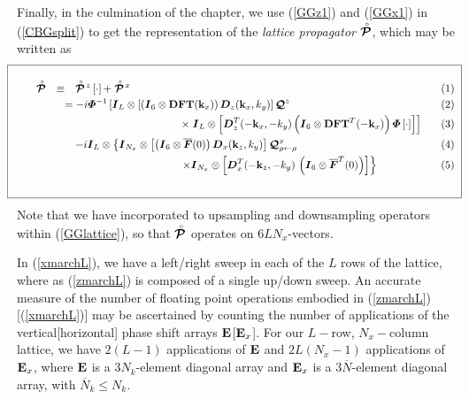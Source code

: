 Finally, in the culmination of the chapter, we use (\ref{GGz1}) and (\ref{GGx1}) in 
(\ref{CBGsplit}) to get the representation of 
the {\em lattice propagator\/} $\stackrel{\scriptscriptstyle _{\,\,\circ}}{ \mbox{\boldmath$\cal P$\unboldmath}}$, which may be written as
\[
\!\!\!\!\!\!\fbox{
\begin{minipage} {146.0mm}
\begin{samepage}
\begin{eqnarray}\label{GGlattice}
\!\!\!\!\!\!\!\!\!
\rf{\CB P} &\equiv&
\rf{\CB P}\!{}^{z}\left[ \cdot \right]+ \rf{\CB  P}\!{}^{x}\nonumber\\
&&\!\!\!\!\!\!= -i{\bmi \Phi}{}^{-1}\left[  {\bmi I}_L \otimes\left[\left({\bmi I}_{6}\otimes 
{\bf DFT}({\bf k}_{x}) \right){\bmi  D}_{z}({\bf k}_{x},{k}_{y})\right]
 {\CB Q}^{z}\right.\nonumber\\
&&\qquad\qquad\qquad\qquad\qquad
\times \left.
 {\bmi I}_L \otimes \left[
{\bmi  D}^{T}_{z}(-{\bf k}_{x},-{k}_{y})\left({\bmi I}_{6}\otimes
{\bf DFT}^{T}(-{\bf k}_{x})  \right)  {\bmi \Phi}\left[ \cdot \right] \right]\right]\nonumber\\
&&
 -{i}{\bmi I}_L \otimes\left\{ {\bmi I}_{N_x} \otimes
\left[\left({\bmi I}_{6}\otimes \overline{\bmi F}(0)  \right)
 {\bmi  D}_{x}({\bf k}_{z},{k}_{y})\right]
 {\CB Q}{}^{x}_{\rho \leftarrow \rho}
\right.\nonumber\\
&&\qquad\qquad\qquad\qquad\qquad
\left.
\times{\bmi I}_{N_x} \otimes \left[{\bmi  D}_{x}^{T}(-{\bf k}_{z},-{k}_{y})
\,\left({\bmi I}_{6}\otimes \overline{\bmi F}^{T}(0)  \right)
\right] \right\}
\end{eqnarray}
\end{samepage}
\vspace{1 mm}
\end{minipage}
}
\]
Note that we have incorporated to upsampling and downsampling operators 
within (\ref{GGlattice}), so that $\stackrel{\scriptscriptstyle _{\,\,\circ}}{ \mbox{\boldmath$\cal P$\unboldmath}}$ operates on $6 L 
N_x$-vectors.


In (\ref{xmarchL}), we have a left/right sweep in each of the $L$ rows of 
the lattice, where as (\ref{zmarchL}) is composed of a single up/down 
sweep. An accurate measure of the number of floating point operations 
embodied in  (\ref{zmarchL})[(\ref{xmarchL})] may be ascertained by counting 
the number of applications of the vertical[horizontal] phase shift arrays 
${\bf E}$[${\bf E}_{x}$]. For our $L-$row, $N_x-$column lattice, we have
$2(L-1)$ applications of ${\bf E}$ and $2 L (N_x-1)$ applications of 
${\bf E}_{x}$, where ${\bf E}$ is a $3 N_k$-element diagonal array and 
${\bf E}_{x}$ is a $3 \overline{N}$-element diagonal array, with 
$\overline{N}_k\le 
{N}_k$. 

